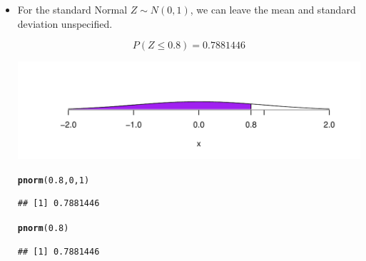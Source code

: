 \documentclass[t,xcolor=pdftex,dvipsnames,table]{beamer}\usepackage[]{graphicx}\usepackage[]{color}
\makeatletter
\def\maxwidth{ %
  \ifdim\Gin@nat@width>\linewidth
    \linewidth
  \else
    \Gin@nat@width
  \fi
}
\newcommand{\hlnum}[1]{\textcolor[rgb]{0.686,0.059,0.569}{#1}}%
\newcommand{\hlstd}[1]{\textcolor[rgb]{0.345,0.345,0.345}{#1}}%
\newcommand{\hlkwd}[1]{\textcolor[rgb]{0.737,0.353,0.396}{\textbf{#1}}}%
\newenvironment{kframe}{%
 \def\at@end@of@kframe{}%
 \ifinner\ifhmode%
  \def\at@end@of@kframe{\end{minipage}}%
  \begin{minipage}{\columnwidth}%
 \fi\fi%
 \def\FrameCommand##1{\hskip\@totalleftmargin \hskip-\fboxsep
 \colorbox{shadecolor}{##1}\hskip-\fboxsep
     \hskip-\linewidth \hskip-\@totalleftmargin \hskip\columnwidth}%
 \MakeFramed {\advance\hsize-\width
   \@totalleftmargin\z@ \linewidth\hsize
   \@setminipage}}%
 {\par\unskip\endMakeFramed%
 \at@end@of@kframe}
\newenvironment{knitrout}{}{} %
\makeatother
\begin{document}
\begin{frame}[fragile]
\begin{itemize}
\item
For the standard Normal $Z \sim N(0,1)$, we can leave the mean and standard deviation unspecified.

\[ P(Z \leq 0.8)  = 0.7881446 \]

\begin{knitrout}
\color{fgcolor}
\includegraphics[width=\maxwidth]{figure/unnamed-chunk-88-1} 

\end{knitrout}

\begin{knitrout}
\color{fgcolor}\begin{kframe}
\begin{alltt}
\hlkwd{pnorm}\hlstd{(}\hlnum{0.8}\hlstd{,}\hlnum{0}\hlstd{,}\hlnum{1}\hlstd{)}
\end{alltt}
\begin{verbatim}
## [1] 0.7881446
\end{verbatim}
\begin{alltt}
\hlkwd{pnorm}\hlstd{(}\hlnum{0.8}\hlstd{)}
\end{alltt}
\begin{verbatim}
## [1] 0.7881446
\end{verbatim}
\end{kframe}
\end{knitrout}

\end{itemize}
\end{frame}
\end{document}
